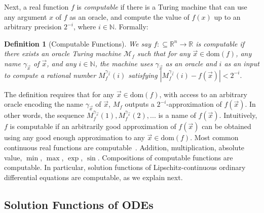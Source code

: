 \documentclass[12pt]{article}
\newcommand{\dom}{\mbox{dom}}
\newtheorem{definition}[theorem]{Definition}
\begin{document}
Next, a real function $f$ is {\em computable} if there is a Turing machine that can use any argument $x$ of $f$ as an oracle, and compute the value of $f(x)$ up to an arbitrary precision $2^{-i}$, where $i\in\mathbb{N}$. Formally: 
\begin{definition}[Computable Functions]\label{comp_functions}
We say $f:\subseteq\mathbb{R}^n\rightarrow \mathbb{R}$ is computable if there exists an oracle Turing machine $\mathcal{M}_f$ such that for any $\vec x\in \dom(f)$, any name $\gamma_{\vec x}$ of $\vec x$, and any $i\in \mathbb{N}$, the machine uses $\gamma_{\vec x}$ as an oracle and $i$ as an input to compute a rational number $M_f^{\gamma_{\vec x}}(i)$ satisfying $|M_f^{\gamma_{\vec x}}(i) - f(\vec x)|<2^{-i}.$
\end{definition}

The definition requires that for any $\vec x\in \dom(f)$, with access to an arbitrary oracle encoding the name $\gamma_{\vec x}$ of $\vec x$, $M_f$ outputs a $2^{-i}$-approximation of $f(\vec x)$. In other words, the sequence $M_f^{\gamma_{\vec x}}(1), M_f^{\gamma_{\vec x}}(2), ...$ is a name of $f(\vec x)$. Intuitively, $f$ is computable if an arbitrarily good approximation of $f(\vec x)$ can be obtained using any good enough approximation to any $\vec x\in\dom(f)$.
Most common continuous real functions are computable~\cite{CAbook}. Addition, multiplication, absolute value, $\min$, $\max$, $\exp$, $\sin$. Compositions of computable functions are computable. In particular, solution functions of Lipschitz-continuous ordinary differential equations are computable, as we explain next. 

\subsection{Solution Functions of ODEs}
\end{document}
